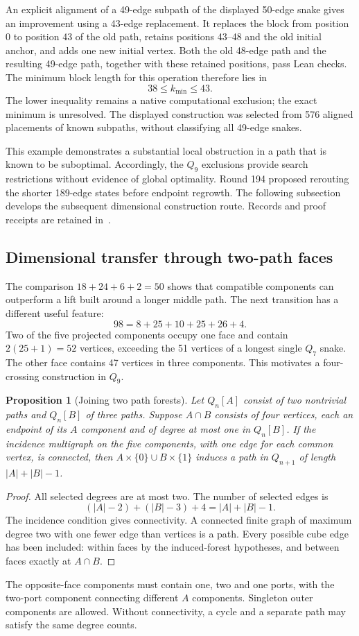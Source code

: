 \documentclass[11pt,a4paper]{article}
\newtheorem{proposition}[theorem]{Proposition}
\theoremstyle{definition}
\theoremstyle{remark}
\begin{document}
An explicit alignment of a 49-edge subpath of the displayed 50-edge
snake gives an improvement using a 43-edge replacement. It replaces
the block from position 0 to position 43 of the old path, retains
positions 43--48 and the old initial anchor, and adds one new initial
vertex. Both the old 48-edge path and the resulting 49-edge path,
together with these retained positions, pass Lean checks.
The minimum block length for this operation therefore lies in
\[
38\le k_{\min}\le43.
\]
The lower inequality remains a native computational exclusion; the
exact minimum is unresolved. The displayed construction was selected
from 576 aligned placements of known subpaths, without classifying
all 49-edge snakes.

This example demonstrates a substantial local obstruction in a path
that is known to be suboptimal. Accordingly, the $Q_9$ exclusions
provide search restrictions without evidence of global optimality.
Round 194 proposed rerouting the shorter 189-edge states before
endpoint regrowth. The following subsection develops the subsequent
dimensional construction route. Records and proof receipts are retained
in~\cite{target194archive}.


\subsection{Dimensional transfer through two-path faces}
\label{sec:forests195}

The comparison $18+24+6+2=50$ shows that compatible components can
outperform a lift built around a longer middle path. The next transition
has a different useful feature:
\[
98=8+25+10+25+26+4.
\]
Two of the five projected components occupy one face and contain
$2(25+1)=52$ vertices, exceeding the 51 vertices of a longest single
$Q_7$ snake. The other face contains 47 vertices in three components.
This motivates a four-crossing construction in $Q_9$.

\begin{proposition}[Joining two path forests]
Let $Q_n[A]$ consist of two nontrivial paths and $Q_n[B]$ of three
paths. Suppose $A\cap B$ consists of four vertices, each an endpoint
of its $A$ component and of degree at most one in $Q_n[B]$.
If the incidence multigraph on the five components, with one edge
for each common vertex, is connected, then
$A\times\{0\}\cup B\times\{1\}$ induces a path in $Q_{n+1}$
of length $|A|+|B|-1$.
\end{proposition}
\begin{proof}
All selected degrees are at most two. The number of selected edges is
\[
(|A|-2)+(|B|-3)+4=|A|+|B|-1.
\]
The incidence condition gives connectivity. A connected finite graph
of maximum degree two with one fewer edge than vertices is a path.
Every possible cube edge has been included: within faces by the
induced-forest hypotheses, and between faces exactly at $A\cap B$.
\end{proof}
The opposite-face components must contain one, two and one ports,
with the two-port component connecting different $A$ components.
Singleton outer components are allowed. Without connectivity, a
cycle and a separate path may satisfy the same degree counts.
\end{document}
